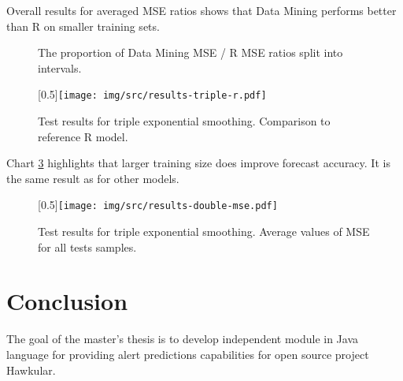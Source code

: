         Overall results for averaged MSE ratios shows that Data Mining performs better than R on smaller training sets.

        \begin{figure}[H]
            \begin{center}
                \caption{The proportion of Data Mining MSE / R MSE ratios split into intervals.}
                \label{img:results-triple-pie}
            \end{center}
        \end{figure}

        \begin{figure}[H]
            \begin{center}
                \scalebox{0.65}[0.5]{\texttt{[image: img/src/results-triple-r.pdf]}}
                \caption{Test results for triple exponential smoothing. Comparison to reference R model.}
                \label{img:results-triple-r}
            \end{center}
        \end{figure}

        Chart \ref{img:results-triple-mse} highlights that larger training size does improve forecast accuracy. It is
        the same result as for other models.

        \begin{figure}[H]
            \begin{center}
                \scalebox{0.65}[0.5]{\texttt{[image: img/src/results-double-mse.pdf]}}
                \caption{Test results for triple exponential smoothing. Average values of MSE for all tests samples.}
                \label{img:results-triple-mse}
            \end{center}
        \end{figure}

\chapter{Conclusion} \label{chap:conclusion}
The goal of the master's thesis is to develop independent module in Java language for providing alert predictions
capabilities for open source project Hawkular.

